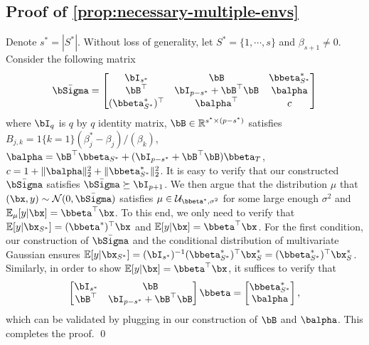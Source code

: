 \documentclass[10pt]{article}
\numberwithin{equation}{section}
\begin{document}
\subsection{Proof of \cref{prop:necessary-multiple-envs}}
\label{prop:necessary-multiple-envs-proof}
    Denote $s^* = |S^*|$. Without loss of generality, let $S^* = \{1,\cdots, s\}$ and $\beta_{s+1} \neq 0$. Consider the following matrix
    \begin{align*}
        \bar{\bSigma} = \begin{bmatrix}
            \bI_{s^*} &\bB &\bbeta^*_{S^*} \\
            \bB^\top &\bI_{p-s^*} + \bB^\top \bB & \balpha \\
            (\bbeta^*_{S^*})^\top & \balpha^\top & c\\
        \end{bmatrix}
    \end{align*} where $\bI_{q}$ is $q$ by $q$ identity matrix, $\bB \in \mathbb{R}^{s^*\times (p-s^*)}$ satisfies $B_{j,k} = 1\{k=1\} (\beta_j^* - \beta_j)/(\beta_k)$, $\balpha = \bB^\top \bbeta_{S^*} + (\bI_{p-s^*} + \bB^\top \bB) \bbeta_{T}$, $c=1+\|\balpha\|_2^2 + \|\bbeta_{S^*}^*\|_2^2$. It is easy to verify that our constructed $\bar{\bSigma}$ satisfies $\bar{\bSigma} \succeq \bI_{p+1}$. We then argue that the distribution $\mu$ that $(\bx,y) \sim \mathcal{N}(0,\bar{\bSigma})$ satisfies $\mu \in \mathcal{U}_{\bbeta^*,\sigma^2}$ for some large enough $\sigma^2$ and $\mathbb{E}_{\mu}[y|\bx] = \bbeta^\top \bx$. To this end, we only need to verify that $\mathbb{E}[y|\bx_{S^*}] = (\bbeta^*)^\top \bx$ and $\mathbb{E}[y|\bx] = \bbeta^\top \bx$. For the first condition, our construction of $\bar{\bSigma}$ and the conditional distribution of multivariate Gaussian ensures $\mathbb{E}[y|\bx_{S^*}] = (\bI_{s^*})^{-1} (\bbeta_{S^*}^*)^\top \bx_S^* = (\bbeta_{S^*}^*)^\top \bx_S^*$. Similarly, in order to show $\mathbb{E}[y|\bx] = \bbeta^\top \bx$, it suffices to verify that
    \begin{align*}
        \begin{bmatrix}
            \bI_{s^*} &\bB \\
            \bB^\top &\bI_{p-s^*} + \bB^\top \bB
        \end{bmatrix} \bbeta = \begin{bmatrix}
            \bbeta^*_{S^*} \\
            \balpha \\
        \end{bmatrix},
    \end{align*} which can be validated by plugging in our construction of $\bB$ and $\balpha$. This completes the proof. \qed
\end{document}
